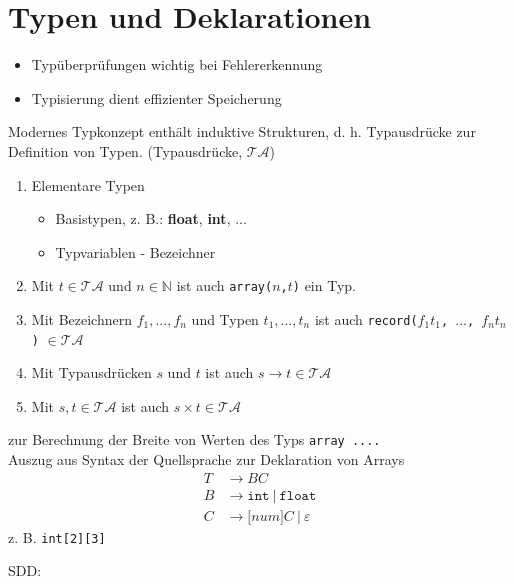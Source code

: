 \section{Typen und Deklarationen}
\begin{itemize}
 \item Typüberprüfungen wichtig bei Fehlererkennung
 \item Typisierung dient effizienter Speicherung
\end{itemize}
Modernes Typkonzept enthält induktive Strukturen, d. h. Typausdrücke zur Definition von Typen.
\Defi (Typausdrücke, $\mathcal{TA}$)
\begin{enumerate}
 \item Elementare Typen
 \begin{itemize}
  \item Basistypen, z. B.: \textbf{float}, \textbf{int}, ...
  \item Typvariablen - Bezeichner
 \end{itemize}
 \item Mit $t \in \mathcal{TA}$ und $n \in \mathbb{N}$ ist auch \texttt{array($n$,$t$)} ein Typ.
 \item Mit Bezeichnern $f_1, ..., f_n$ und Typen $t_1, ..., t_n$ ist auch \texttt{record($f_1 t_1$, $...$, $f_n t_n$)} $\in \mathcal{TA}$
 \item Mit Typausdrücken $s$ und $t$ ist auch $s \to t \in \mathcal{TA}$
 \item Mit $s, t \in \mathcal{TA}$ ist auch $s \times t \in \mathcal{TA}$
\end{enumerate}

\Bsp zur Berechnung der Breite von Werten des Typs \texttt{array ....} \\
Auszug aus Syntax der Quellsprache zur Deklaration von Arrays
\begin{align*}
    T &\to BC \\
    B &\to \texttt{int}\ |\ \texttt{float} \\
    C &\to \texttt{[}\textit{num}\texttt{]}C\ |\ \varepsilon
\end{align*}
z. B. \texttt{int[2][3]}
\begin{center}
\end{center}

SDD:
\begin{center}
\end{center}



